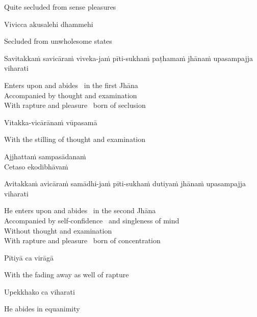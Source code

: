 \begin{english}
  Quite secluded from sense pleasures
\end{english}

Vivicca akusalehi dhammehi

\begin{english}
  Secluded from unwholesome states
\end{english}

\begin{pali-hang}
  Savitakkaṁ savicāraṁ viveka-jaṁ pīti-sukhaṁ paṭhamaṁ jhānaṁ upasampajja viharati
\end{pali-hang}

\begin{english-verses}
  Enters upon and abides \breathmark\ in the first Jhāna\\
  Accompanied by thought and examination\\
  With rapture and pleasure \breathmark\ born of seclusion
\end{english-verses}

Vitakka-vicārānaṁ vūpasamā

\begin{english}
  With the stilling of thought and examination
\end{english}

Ajjhattaṁ sampasādanaṁ\\
Cetaso ekodibhāvaṁ
\begin{pali-hangtogether}
  Avitakkaṁ avicāraṁ samādhi-jaṁ pīti-sukhaṁ dutiyaṁ jhānaṁ upasampajja viharati
\end{pali-hangtogether}

\begin{english-verses}
  He enters upon and abides \breathmark\ in the second Jhāna\\
  Accompanied by self-confidence \breathmark\ and singleness of mind\\
  Without thought and examination\\
  With rapture and pleasure \breathmark\ born of concentration
\end{english-verses}

Pītiyā ca virāgā

\begin{english}
  With the fading away as well of rapture
\end{english}

Upekkhako ca viharati

\begin{english}
  He abides in equanimity
\end{english}

